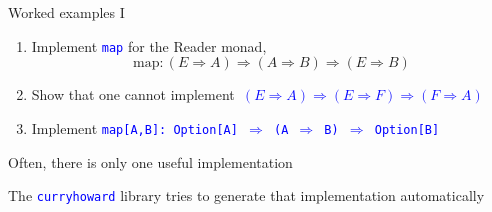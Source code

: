 \documentclass[english]{beamer}
\begin{document}
\begin{frame}{Worked examples I}

\begin{enumerate}
\item Implement \texttt{\textcolor{blue}{\footnotesize{}map}} for the Reader
monad,{\footnotesize{}
\[
\text{map}:\left(E\Rightarrow A\right)\Rightarrow\left(A\Rightarrow B\right)\Rightarrow\left(E\Rightarrow B\right)
\]
}{\footnotesize \par}
\item Show that one cannot implement\texttt{\textcolor{blue}{\footnotesize{}
$\left(E\Rightarrow A\right)\Rightarrow\left(E\Rightarrow F\right)\Rightarrow\left(F\Rightarrow A\right)$}}{\footnotesize \par}
\item Implement \texttt{\textcolor{blue}{\footnotesize{}map{[}A,B{]}:\ Option{[}A{]}
$\Rightarrow$ (A $\Rightarrow$ B) $\Rightarrow$ Option{[}B{]}}}{\footnotesize \par}
\end{enumerate}
Often, there is only one useful implementation

The \texttt{\textcolor{blue}{\footnotesize{}curryhoward}} library
tries to generate that implementation automatically
\end{frame}
\end{document}
